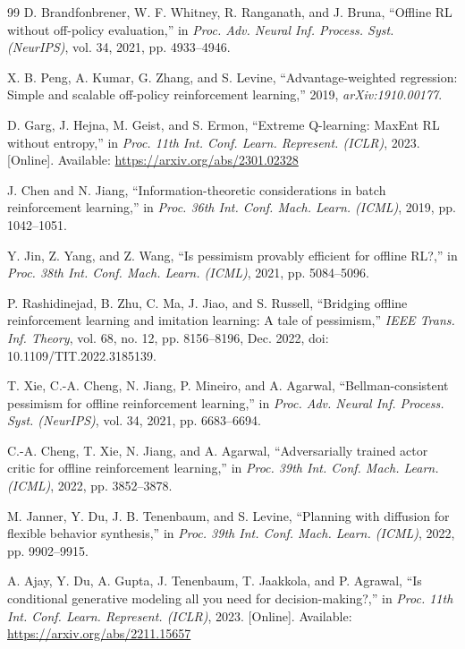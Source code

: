 \documentclass[journal]{IEEEtran}
\begin{document}
\begin{thebibliography}{99}
D. Brandfonbrener, W. F. Whitney, R. Ranganath, and J. Bruna, ``Offline RL without off-policy evaluation,'' in \emph{Proc. Adv. Neural Inf. Process. Syst. (NeurIPS)}, vol. 34, 2021, pp. 4933--4946.

X. B. Peng, A. Kumar, G. Zhang, and S. Levine, ``Advantage-weighted regression: Simple and scalable off-policy reinforcement learning,'' 2019, \emph{arXiv:1910.00177}.

D. Garg, J. Hejna, M. Geist, and S. Ermon, ``Extreme Q-learning: MaxEnt RL without entropy,'' in \emph{Proc. 11th Int. Conf. Learn. Represent. (ICLR)}, 2023. [Online]. Available: \url{https://arxiv.org/abs/2301.02328}

J. Chen and N. Jiang, ``Information-theoretic considerations in batch reinforcement learning,'' in \emph{Proc. 36th Int. Conf. Mach. Learn. (ICML)}, 2019, pp. 1042--1051.

Y. Jin, Z. Yang, and Z. Wang, ``Is pessimism provably efficient for offline RL?,'' in \emph{Proc. 38th Int. Conf. Mach. Learn. (ICML)}, 2021, pp. 5084--5096.

P. Rashidinejad, B. Zhu, C. Ma, J. Jiao, and S. Russell, ``Bridging offline reinforcement learning and imitation learning: A tale of pessimism,'' \emph{IEEE Trans. Inf. Theory}, vol. 68, no. 12, pp. 8156--8196, Dec. 2022, doi: 10.1109/TIT.2022.3185139.

T. Xie, C.-A. Cheng, N. Jiang, P. Mineiro, and A. Agarwal, ``Bellman-consistent pessimism for offline reinforcement learning,'' in \emph{Proc. Adv. Neural Inf. Process. Syst. (NeurIPS)}, vol. 34, 2021, pp. 6683--6694.

C.-A. Cheng, T. Xie, N. Jiang, and A. Agarwal, ``Adversarially trained actor critic for offline reinforcement learning,'' in \emph{Proc. 39th Int. Conf. Mach. Learn. (ICML)}, 2022, pp. 3852--3878.

M. Janner, Y. Du, J. B. Tenenbaum, and S. Levine, ``Planning with diffusion for flexible behavior synthesis,'' in \emph{Proc. 39th Int. Conf. Mach. Learn. (ICML)}, 2022, pp. 9902--9915.

A. Ajay, Y. Du, A. Gupta, J. Tenenbaum, T. Jaakkola, and P. Agrawal, ``Is conditional generative modeling all you need for decision-making?,'' in \emph{Proc. 11th Int. Conf. Learn. Represent. (ICLR)}, 2023. [Online]. Available: \url{https://arxiv.org/abs/2211.15657}


\end{thebibliography}
\end{document}
